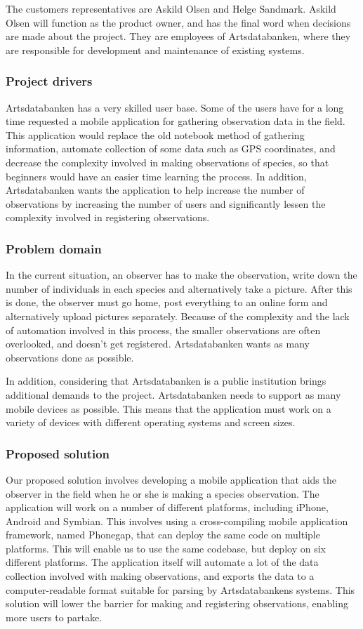 The customers representatives are Askild Olsen and Helge Sandmark. Askild Olsen
will function as the product owner, and has the final word when decisions are
made about the project. They are employees of Artsdatabanken, where they are
responsible for development and maintenance of existing systems. 

\subsubsection{Project drivers}
Artsdatabanken has a very skilled user base. Some of the users have for a long
time requested a mobile application for gathering observation data in the
field. This application would replace the old notebook method of gathering
information, automate collection of some data such as GPS coordinates, and
decrease the complexity involved in making observations of species, so that
beginners would have an easier time learning the process. In addition,
Artsdatabanken wants the application to help increase the number of
observations by increasing the number of users and significantly lessen the
complexity involved in registering observations.

\subsubsection{Problem domain}
In the current situation, an observer has to make the observation, write down
the number of individuals in each species and alternatively take a picture. After this is done,
the observer must go home, post everything to an online form and
alternatively upload pictures separately. Because of the complexity and the
lack of automation involved in this process, the smaller observations are often
overlooked, and doesn't get registered. Artsdatabanken wants as many
observations done as possible.

In addition, considering that Artsdatabanken is a public institution brings
additional demands to the project. Artsdatabanken needs to support as many
mobile devices as possible. This means that the application must work on
a variety of devices with different operating systems and screen sizes.

\subsubsection{Proposed solution}
Our proposed solution involves developing a mobile application that aids the
observer in the field when he or she is making a species observation. The
application will work on a number of different platforms, including iPhone,
Android and Symbian. This involves using a cross-compiling mobile application
framework, named Phonegap, that can deploy the same code on multiple platforms.
This will enable us to use the same codebase, but deploy on six different
platforms. The application itself will automate a lot of the data collection
involved with making observations, and exports the data to a computer-readable
format suitable for parsing by Artsdatabankens systems. This solution will
lower the barrier for making and registering observations, enabling more users
to partake.

